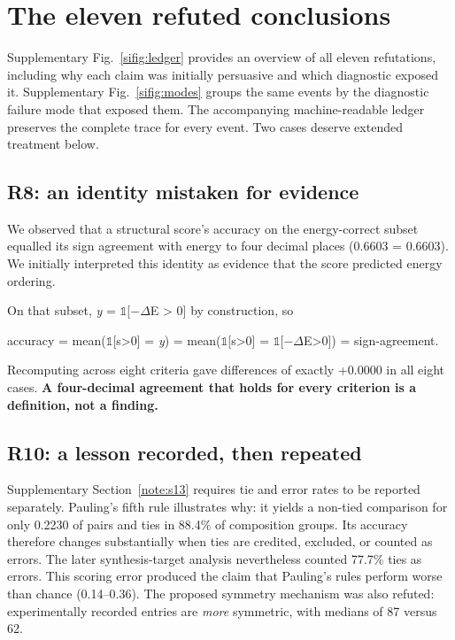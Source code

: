 \section{The eleven refuted conclusions}\label{note:s6}

Supplementary Fig.~\ref{sifig:ledger} provides an overview of all eleven
refutations, including why each claim was initially persuasive and which
diagnostic exposed it. Supplementary Fig.~\ref{sifig:modes} groups the same
events by the diagnostic failure mode that exposed them. The accompanying
machine-readable ledger
preserves the complete trace for every event. Two cases deserve extended
treatment below.

\subsection{R8: an identity mistaken for evidence}\label{s6.1-r8-an-identity-mistaken-for-evidence}

We observed that a structural score's accuracy on the energy-correct subset
equalled its sign agreement with energy to four decimal places (0.6603 = 0.6603).
We initially interpreted this identity as evidence that the score predicted
energy ordering.

On that subset, \emph{y} = $\mathbb{1}${[}$-$$\Delta$E \textgreater{} 0{]} by construction, so

accuracy = mean($\mathbb{1}${[}s\textgreater0{]} = \emph{y}) = mean($\mathbb{1}${[}s\textgreater0{]} = $\mathbb{1}${[}$-$$\Delta$E\textgreater0{]}) = sign-agreement.

Recomputing across eight criteria gave differences of exactly +0.0000 in all eight cases.
\textbf{A four-decimal agreement that holds for every criterion is a definition, not a finding.}

\subsection{R10: a lesson recorded, then repeated}\label{s6.2-r10-a-lesson-recorded-then-repeated}

Supplementary Section~\ref{note:s13} requires tie and error rates to be reported
separately. Pauling's fifth rule illustrates why: it yields a non-tied comparison
for only 0.2230 of pairs and ties in 88.4\% of composition groups. Its accuracy
therefore changes substantially when ties are credited, excluded, or counted as
errors. The later synthesis-target analysis nevertheless counted 77.7\% ties as
errors. This scoring error produced the claim that Pauling's rules perform worse
than chance (0.14--0.36). The proposed symmetry mechanism was also refuted:
experimentally recorded entries are \emph{more} symmetric, with medians of 87
versus 62.

